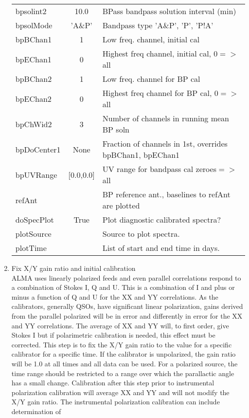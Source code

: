 \documentclass[11pt]{article}
\begin{document}
\begin{enumerate}
\begin{center}
\begin{tabular}{|l|c|l|}
bpsolint2  & 10.0 & BPass bandpass solution interval (min) \\
bpsolMode  & 'A\&P'  &  Bandpass type 'A\&P', 'P', 'P!A'\\
bpBChan1  & 1 &  Low freq. channel,  initial cal\\
bpEChan1  & 0 &  Highest freq channel, initial cal, 0$=>$all\\
bpBChan2  & 1 &  Low freq. channel for BP cal\\
bpEChan2  & 0 &  Highest freq channel for BP cal,  0$=>$all \\
bpChWid2  & 3 &  Number of channels in running mean BP soln\\
bpDoCenter1  & None &  Fraction of  channels in 1st, overrides
bpBChan1, bpEChan1\\
bpUVRange  & [0.0,0.0] &  UV range for bandpass cal zeroes$=>$ all\\
refAnt  &  & BP reference ant., baselines to refAnt are plotted \\
doSpecPlot     & True &  Plot diagnostic calibrated spectra?\\
plotSource     & & Source to plot spectra.\\
plotTime       & & List of start and end time in days.\\
\hline
\end{tabular}
\end{center}
\newpage
%
\item Fix X/Y gain ratio and initial calibration \label{xygain} \\
ALMA uses linearly polarized feeds and even parallel correlations
respond to a combination of Stokes I, Q and U.
This is a combination of I and plus or minus a function of Q and U for
the XX and YY correlations.
As the calibrators, generally QSOs, have significant linear
polarization, gains derived from the parallel polarized will be in
error and differently in error for the XX and YY correlations.
The average of XX and YY will, to first order, give Stokes I but if
polarimetric calibration is needed, this effect must be corrected.
This step is to fix the X/Y gain ratio to the value for a specific
calibrator for a specific time.
If the calibrator is unpolarized, the gain ratio will be 1.0 at all
times and all data can be used.
For a polarized source, the time range should be restricted to a range
over which the parallactic angle has a small change.
Calibration after this step prior to instrumental polarization
calibration will average XX and YY and will not modify the X/Y gain
ratio.
The instrumental polarization calibration can include determination of

\end{enumerate}
\end{document}
